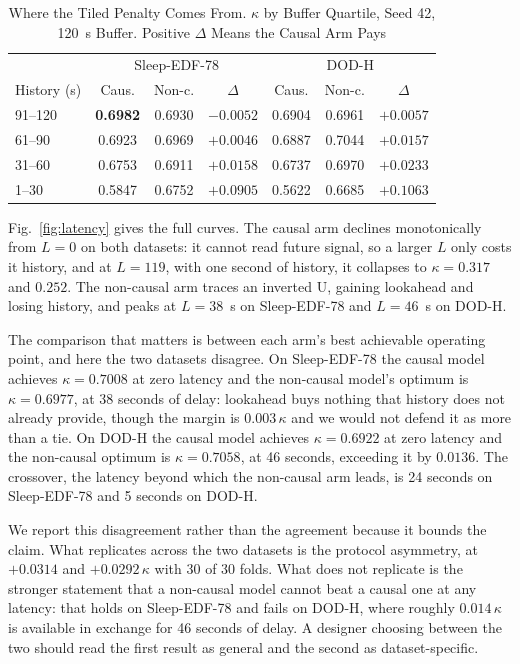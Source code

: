 \documentclass[conference]{IEEEtran}
\begin{document}
\begin{table}[t]
\caption{Where the Tiled Penalty Comes From. $\kappa$ by Buffer Quartile, Seed 42, 120~s Buffer.
Positive $\Delta$ Means the Causal Arm Pays}
\label{tab:quartile}
\centering
\footnotesize
\setlength{\tabcolsep}{3.6pt}
\begin{tabular}{lccc|ccc}
\toprule
 & \multicolumn{3}{c|}{Sleep-EDF-78} & \multicolumn{3}{c}{DOD-H} \\
History (s) & Caus. & Non-c. & $\Delta$ & Caus. & Non-c. & $\Delta$ \\
\midrule
91--120 & \textbf{0.6982} & 0.6930 & $-0.0052$ & 0.6904 & 0.6961 & $+0.0057$ \\
61--90  & 0.6923 & 0.6969 & $+0.0046$ & 0.6887 & 0.7044 & $+0.0157$ \\
31--60  & 0.6753 & 0.6911 & $+0.0158$ & 0.6737 & 0.6970 & $+0.0233$ \\
1--30   & 0.5847 & 0.6752 & $+0.0905$ & 0.5622 & 0.6685 & $+0.1063$ \\
\bottomrule
\end{tabular}
\end{table}

Fig.~\ref{fig:latency} gives the full curves. The causal arm declines monotonically from $L = 0$ on
both datasets: it cannot read future signal, so a larger $L$ only costs it history, and at
$L = 119$, with one second of history, it collapses to $\kappa = 0.317$ and $0.252$. The non-causal
arm traces an inverted U, gaining lookahead and losing history, and peaks at $L = 38$~s on Sleep-EDF-78
and $L = 46$~s on DOD-H.

The comparison that matters is between each arm's best achievable operating point, and here the two
datasets disagree. On Sleep-EDF-78 the causal model achieves $\kappa = 0.7008$ at zero latency and
the non-causal model's optimum is $\kappa = 0.6977$, at 38 seconds of delay: lookahead buys nothing
that history does not already provide, though the margin is $0.003\,\kappa$ and we would not defend
it as more than a tie. On DOD-H the causal model achieves $\kappa = 0.6922$ at zero latency and the
non-causal optimum is $\kappa = 0.7058$, at 46 seconds, exceeding it by $0.0136$. The crossover,
the latency beyond which the non-causal arm leads, is 24 seconds on Sleep-EDF-78 and 5 seconds on
DOD-H.

We report this disagreement rather than the agreement because it bounds the claim. What replicates
across the two datasets is the protocol asymmetry, at $+0.0314$ and $+0.0292\,\kappa$ with 30 of 30
folds. What does not replicate is the stronger statement that a non-causal model cannot beat a
causal one at any latency: that holds on Sleep-EDF-78 and fails on DOD-H, where roughly
$0.014\,\kappa$ is available in exchange for 46 seconds of delay. A designer choosing between the
two should read the first result as general and the second as dataset-specific.
\end{document}
